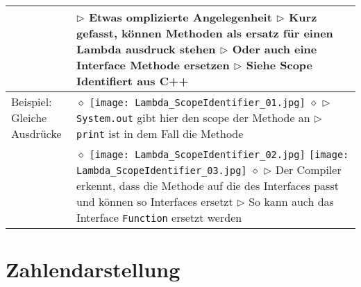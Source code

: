 	\begin{table}[H]
	\label{Methodennamen als Lambda}
	\begin{tabular}{ | p{4cm} p{13.5cm} | }
	

	\hline
	\makecell[l]{Funktion} & 
	\makecell[l]
	{
	$\rhd$ Etwas omplizierte Angelegenheit \\
	$\rhd$ Kurz gefasst, können Methoden als ersatz für einen Lambda ausdruck stehen \\
	$\rhd$ Oder auch eine Interface Methode ersetzen \\
	$\rhd$ Siehe Scope Identifiert aus C++ \\
	} 	\\ \hline


	\makecell[l]{Beispiel: \\ Gleiche Ausdrücke} & 
	\makecell[l]
	{
	$\diamond$ \\
	\texttt{[image: Lambda\_ScopeIdentifier\_01.jpg]} \\
	$\diamond$ \\
	$\rhd$ \texttt{System.out} gibt hier den scope der Methode an \\
	$\rhd$ \texttt{print} ist in dem Fall die Methode \\
	} 	\\ \hline


	\makecell[l]{Erklärung} & 
	\makecell[l]
	{
	$\diamond$ \\
	\texttt{[image: Lambda\_ScopeIdentifier\_02.jpg]}
	\texttt{[image: Lambda\_ScopeIdentifier\_03.jpg]} \\
	$\diamond$ \\
	$\rhd$ Der Compiler erkennt, dass die Methode auf die des Interfaces passt \\
	\hspace{0.35cm} und können so Interfaces ersetzt \\
	$\rhd$ So kann auch das Interface \texttt{Function} ersetzt werden \\
	} 	\\ \hline


	\end{tabular}
	\end{table}



\section{Zahlendarstellung}


